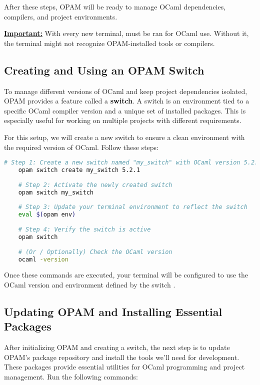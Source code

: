 \noindent
After these steps, OPAM will be ready to manage OCaml dependencies, compilers, and project environments.
\begin{Note}
	\underline{\textbf{Important:}} With every new terminal,  must be ran for OCaml use.
	Without it, the terminal might not recognize OPAM-installed tools or compilers.
\end{Note}

\subsection{Creating and Using an OPAM Switch}

To manage different versions of OCaml and keep project dependencies isolated, OPAM provides a feature called a \textbf{switch}.
A switch is an environment tied to a specific OCaml compiler version and a unique set of installed packages. This is especially
useful for working on multiple projects with different requirements.

\newpage
\noindent
For this setup, we will create a new switch to ensure a clean environment with the required version of OCaml.
Follow these steps:

\begin{lstlisting}[language=Bash, caption={Creating and Activating an OPAM Switch}]
    # Step 1: Create a new switch named "my_switch" with OCaml version 5.2.1
    opam switch create my_switch 5.2.1
    
    # Step 2: Activate the newly created switch
    opam switch my_switch
    
    # Step 3: Update your terminal environment to reflect the switch
    eval $(opam env)
    
    # Step 4: Verify the switch is active
    opam switch
    
    # (Or / Optionally) Check the OCaml version
    ocaml -version
\end{lstlisting}

\noindent
Once these commands are executed, your terminal will be configured to use the OCaml version and environment
defined by the switch .

\subsection{Updating OPAM and Installing Essential Packages}
After initializing OPAM and creating a switch, the next step is to update OPAM's package repository and install
the tools we’ll need for development. These packages provide essential utilities for OCaml programming and project management.
Run the following commands:


